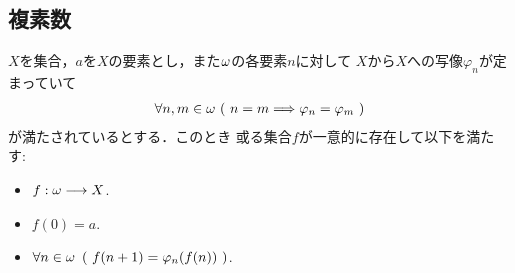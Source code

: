 \subsection{複素数}
	
	\begin{screen}
		\begin{thm}[再帰定理]
			$X$を集合，$a$を$X$の要素とし，また${\bf \omega}$の各要素$n$に対して
			$X$から$X$への写像$\varphi_n$が定まっていて
			\begin{align}
				\forall n,m \in {\bf \omega}\ (\ n=m \Longrightarrow \varphi_n = \varphi_m\ )
			\end{align}
			が満たされているとする．このとき
			或る集合$f$が一意的に存在して以下を満たす:
			\begin{itemize}
				\item $f:{\bf \omega} \longrightarrow X$.
				\item $f(0) = a$.
				\item $\forall n \in {\bf \omega}\ \left(\ f(n+1) = \varphi_n(f(n))\ \right)$.
			\end{itemize}
		\end{thm}
	\end{screen}
	
